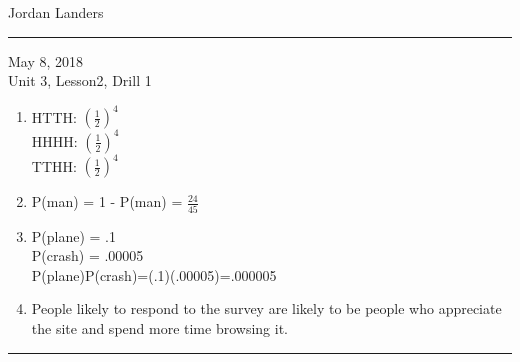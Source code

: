 \documentclass[final]{article}
\begin{document}
\noindent Jordan Landers\\
\hrule
\vspace{24pt}

\noindent May 8, 2018\\
Unit 3, Lesson2, Drill 1


\begin{enumerate}
\item HTTH: $(\frac{1}{2})^4$\\
HHHH: $(\frac{1}{2})^4$\\
TTHH: $(\frac{1}{2})^4$
\item P(man) = 1 - P(man) = $\frac{24}{45}$
\item P(plane) = .1\\
P(crash) = .00005\\
P(plane)P(crash)=(.1)(.00005)=.000005
\item People likely to respond to the survey are likely to be people who appreciate the site and spend more time browsing it. 
\end{enumerate}

\vspace{14pt}
\hrule
\vspace{24pt}
\end{document}
